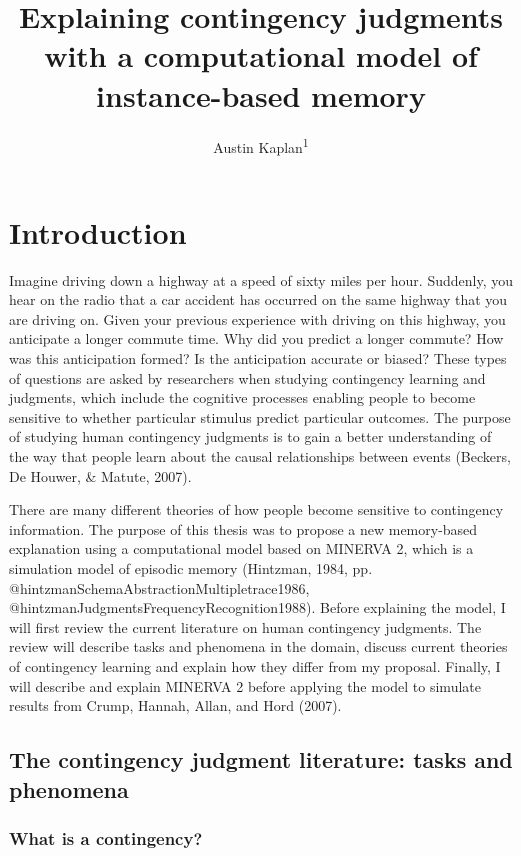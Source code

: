 \documentclass[
  english,
  man,floatsintext]{apa6}
\title{Explaining contingency judgments with a computational model of instance-based memory}
\author{Austin Kaplan\textsuperscript{1}}
\date{}
\affiliation{\vspace{0.5cm}\textsuperscript{1} Brooklyn College}
\begin{document}
\maketitle

\hypertarget{introduction}{%
\section{Introduction}\label{introduction}}

Imagine driving down a highway at a speed of sixty miles per hour. Suddenly, you hear on the radio that a car accident has occurred on the same highway that you are driving on. Given your previous experience with driving on this highway, you anticipate a longer commute time. Why did you predict a longer commute? How was this anticipation formed? Is the anticipation accurate or biased? These types of questions are asked by researchers when studying contingency learning and judgments, which include the cognitive processes enabling people to become sensitive to whether particular stimulus predict particular outcomes. The purpose of studying human contingency judgments is to gain a better understanding of the way that people learn about the causal relationships between events (Beckers, De Houwer, \& Matute, 2007).

There are many different theories of how people become sensitive to contingency information. The purpose of this thesis was to propose a new memory-based explanation using a computational model based on MINERVA 2, which is a simulation model of episodic memory (Hintzman, 1984, pp. @hintzmanSchemaAbstractionMultipletrace1986, @hintzmanJudgmentsFrequencyRecognition1988). Before explaining the model, I will first review the current literature on human contingency judgments. The review will describe tasks and phenomena in the domain, discuss current theories of contingency learning and explain how they differ from my proposal. Finally, I will describe and explain MINERVA 2 before applying the model to simulate results from Crump, Hannah, Allan, and Hord (2007).

\hypertarget{the-contingency-judgment-literature-tasks-and-phenomena}{%
\subsection{The contingency judgment literature: tasks and phenomena}\label{the-contingency-judgment-literature-tasks-and-phenomena}}

\hypertarget{what-is-a-contingency}{%
\subsubsection{What is a contingency?}\label{what-is-a-contingency}}
\end{document}
